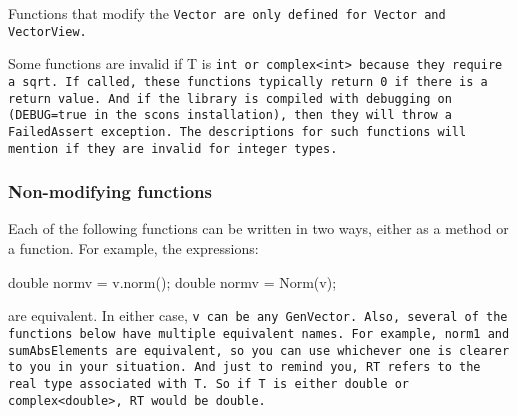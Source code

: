 Functions that modify the \tt{Vector} are only defined for 
\tt{Vector} and \tt{VectorView}.

Some functions are invalid if T is \tt{int} or \tt{complex<int>} because they require 
a \tt{sqrt}.  If called, these functions typically return \tt{0} if there is a return value.
And if the library is compiled with debugging on (\tt{DEBUG=true} in the scons installation),
then they will throw a \tt{FailedAssert} exception.  The descriptions for such functions
will mention if they are invalid for integer types.

\subsubsection{Non-modifying functions}

Each of the following functions can be written in two ways, either as a method or a function.
For example, the expressions:
\begin{tmvcode}
double normv = v.norm();
double normv = Norm(v);
\end{tmvcode}
are equivalent.  In either case, \tt{v} can be any \tt{GenVector}.
Also, several of the functions below have multiple equivalent names.  For example,
\tt{norm1} and \tt{sumAbsElements} are equivalent, so you can use whichever one is
clearer to you in your situation.  And just to remind you, \tt{RT} refers to the 
real type associated with \tt{T}.  So if \tt{T} is either \tt{double} or \tt{complex<double>},
\tt{RT} would be \tt{double}.

